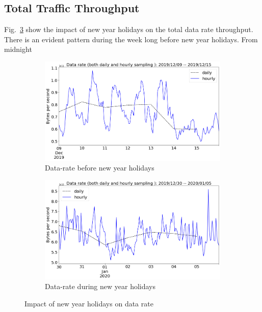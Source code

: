 \documentclass[10pt, journal, letterpaper]{IEEEtran}
\newcommand\linearFigSze{0.48}
\begin{document}
\subsection{Total Traffic Throughput}
Fig.~\ref{fig:datarate_BCH_CH} show the impact of new year holidays on the total data rate throughput. There is an evident pattern during the week long before new year holidays. From midnight
\begin{figure}
    \begin{subfigure}{\linearFigSze\textwidth}
          \centering
          \includegraphics[width=\columnwidth]{img/BCH2_byterate.png}
          \caption{Data-rate before new year holidays}
          \label{fig:BCH2_bps}
    \end{subfigure}
    \begin{subfigure}{\linearFigSze\textwidth}
          \centering
          \includegraphics[width=\columnwidth]{img/CH2_byterate.png}
          \caption{Data-rate during new year holidays}
          \label{fig:CH2_bps}
    \end{subfigure}
    \caption{Impact of new year holidays on data rate}
    \label{fig:datarate_BCH_CH}
\end{figure}
\end{document}
